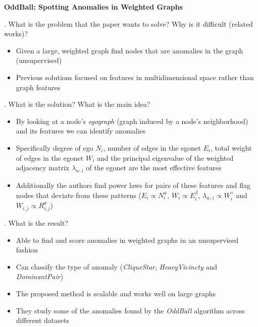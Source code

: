 \documentclass[12pt]{article}
\begin{document}
 

{\Large\centering
    \textbf{OddBall: Spotting Anomalies in Weighted Graphs}
\par}

\bigskip

. What is the problem that the paper wants to solve? Why is it difficult (related works)?

\begin{itemize}
    \item Given a large, weighted graph find nodes that are anomalies in the graph (unsupervised)
    \item Previous solutions focused on features in multidimensional space rather than graph features
\end{itemize}

. What is the solution? What is the main idea?

\begin{itemize}
    \item By looking at a node's \emph{egograph} (graph induced by a node's neighborhood) and its features we can identify anomalies
    \item Specifically degree of ego $N_i$, number of edges in the egonet $E_i$, total weight of edges in the egonet $W_i$ and the principal eigenvalue of the weighted adjacency matrix $\lambda_{w,i}$ of the egonet are the most effective features
    \item Additionally the authors find power laws for pairs of these features and flag nodes that deviate from these patterns ($E_i \propto N_i^\alpha$, $W_i \propto E_i^\beta$, $\lambda_{w,i} \propto W_i^\gamma$ and $W_{i,j} \propto R_{i,j}^\theta$)
\end{itemize}

. What is the result?

\begin{itemize}
    \item Able to find and score anomalies in weighted graphs in an unsupervised fashion
    \item Can classify the type of anomaly (\emph{CliqueStar}, \emph{HeavyVicincty} and \emph{DominantPair})
    \item The proposed method is scalable and works well on large graphs
    \item They study some of the anomalies found by the \emph{OddBall} algorithm across different datasets
\end{itemize}
\end{document}
